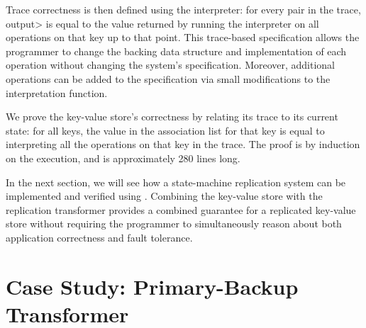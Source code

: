 Trace correctness is then defined using the interpreter: for every
 pair in the trace,
\<output> is equal to the value returned by running the
interpreter on all operations on that key up to that point.
This trace-based specification allows the programmer to change the
backing data structure and implementation of each operation
without changing the system's specification. Moreover, additional
operations can be added to the specification via small modifications to the
interpretation function.

We prove the key-value store's correctness by relating its trace to
its current state: for all keys, the value in the association list for
that key is equal to interpreting all the operations on that key in
the trace. The proof is by induction on the execution, and is
approximately 280 lines long.

In the next section, we will see how a state-machine replication
system can be implemented and verified using \Verdi. Combining the
key-value store with the replication transformer provides a
combined guarantee for a replicated key-value store without
requiring the programmer to simultaneously reason about both
application correctness and fault tolerance.

\section{Case Study: Primary-Backup Transformer}\label{sec:verdi:casestudy-pbj}

